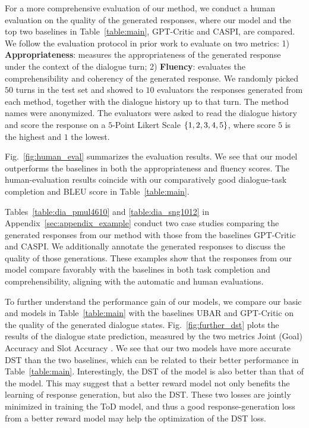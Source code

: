 For a more comprehensive evaluation of our method, we conduct a human evaluation on the quality of the generated responses, where our model and the top two baselines in Table~\ref{table:main}, GPT-Critic and CASPI, are compared.
We follow the evaluation protocol in prior work \citep[\eg,][]{damd2020,caspi2021,gptcritic2022} to evaluate on two metrics:
1) \textbf{Appropriateness}: measures the appropriateness of the generated response under the context of the dialogue turn;
2) \textbf{Fluency}: evaluates the comprehensibility and coherency of the generated response.
We randomly picked $50$ turns in the test set and showed to $10$ evaluators the responses generated from each method, together with the dialogue history up to that turn.  
The method names were anonymized.
The evaluators were asked to read the dialogue history and score the response on a $5$-Point Likert Scale $\left\{1,2,3,4,5\right\}$, where score $5$ is the highest and $1$ the lowest.

Fig.~\ref{fig:human_eval} summarizes the evaluation results.
We see that our model outperforms the baselines in both the appropriateness and fluency scores.
The human-evaluation results coincide with our comparatively good dialogue-task completion and BLEU score in
Table~\ref{table:main}.

Tables~\ref{table:dia_pmul4610} and \ref{table:dia_sng1012} in Appendix~\ref{sec:appendix_example} conduct two case studies comparing the generated responses from our method with those from the baselines GPT-Critic and CASPI.
We additionally annotate the generated responses to discuss the quality of those generations.
These examples show that the responses from our model compare favorably with the baselines in both task completion and comprehensibility, aligning with the automatic and human evaluations.

To further understand the performance gain of our models, we compare our basic \rewardnet and \rewardmle models in Table~\ref{table:main} with the baselines UBAR and GPT-Critic on the quality of the generated dialogue states.
Fig.~\ref{fig:further_dst} plots the results of the dialogue state prediction, measured by the two metrics Joint (Goal) Accuracy and Slot Accuracy \citep{wu2019transferable}.
We see that our two models have more accurate DST than the two baselines, which can be related to their better performance in Table~\ref{table:main}.
Interestingly, the DST of the \rewardmle model is also better than that of the \rewardnet model. 
This may suggest that a better reward model not only benefits the learning of response generation, but also the DST. 
These two losses are jointly minimized in training the ToD model, and thus a good response-generation loss from a better reward model may help the optimization of the DST loss.


